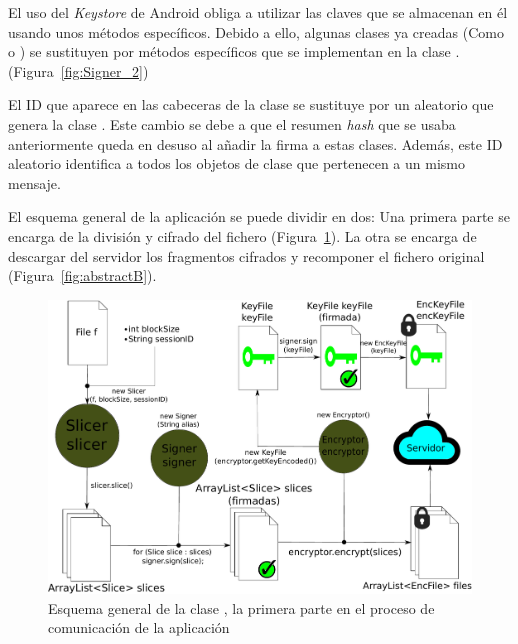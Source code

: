 El uso del \emph{Keystore} de Android obliga a utilizar las claves que se almacenan en él usando unos métodos específicos. Debido a ello, algunas clases ya creadas (Como  o ) se sustituyen por métodos específicos que se implementan en la clase . (Figura~\ref{fig:Signer_2})

El ID que aparece en las cabeceras de la clase  se sustituye por un  aleatorio que genera la clase . Este cambio se debe a que el resumen \emph{hash} que se usaba anteriormente queda en desuso al añadir la firma a estas clases. Además, este ID aleatorio identifica a todos los objetos de clase  que pertenecen a un mismo mensaje.

El esquema general de la aplicación se puede dividir en dos: Una primera parte se encarga de la división y cifrado del fichero (Figura~\ref{fig:abstractA}). La otra se encarga de descargar del servidor los fragmentos cifrados y recomponer el fichero original (Figura~\ref{fig:abstractB}).

\begin{figure}[!htb]
  \centering
  \includegraphics[scale=0.44]{Figures/abstractA}
  \decoRule
  \caption[]{Esquema general de la clase , la primera parte en el proceso de comunicación de la aplicación}
  \label{fig:abstractA}
\end{figure}

